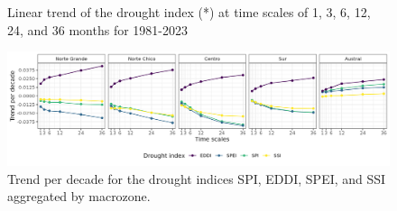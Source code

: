 \documentclass[
  authoryear,
  preprint,
  3p,
  onecolumn]{elsarticle}
\begin{document}
\begin{figure}
\begin{minipage}[t]{0.50\linewidth}
{{}

}

\end{minipage}%
\newline
\begin{minipage}[t]{0.50\linewidth}

{\centering 


}

\end{minipage}%

\caption{\label{fig-trendDI}Linear trend of the drought index (*) at
time scales of 1, 3, 6, 12, 24, and 36 months for 1981-2023}

\end{figure}

\elandscape

\begin{figure}[!ht]

{\centering \includegraphics{../output/figs/trend_macrozone_drought_indices.png}

}

\caption{\label{fig-trendDIMacro}Trend per decade for the drought
indices SPI, EDDI, SPEI, and SSI aggregated by macrozone.}

\end{figure}
\end{document}
